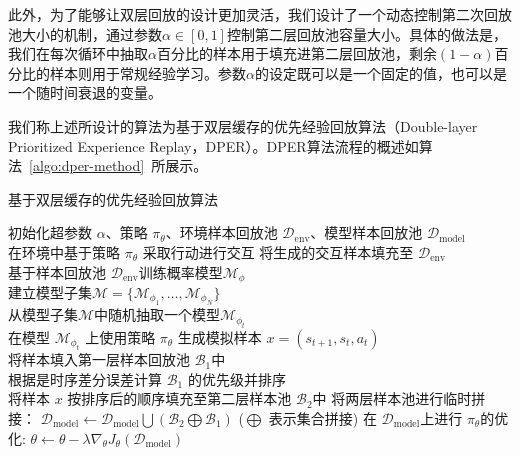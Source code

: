 此外，为了能够让双层回放的设计更加灵活，我们设计了一个动态控制第二次回放池大小的机制，通过参数$\alpha\in[0,1]$控制第二层回放池容量大小。具体的做法是，我们在每次循环中抽取$\alpha$百分比的样本用于填充进第二层回放池，剩余$(1-\alpha)$百分比的样本则用于常规经验学习。参数$\alpha$的设定既可以是一个固定的值，也可以是一个随时间衰退的变量。

我们称上述所设计的算法为基于双层缓存的优先经验回放算法（Double-layer Prioritized Experience Replay，DPER）。DPER算法流程的概述如算法~\ref{algo:dper-method}~所展示。

\begin{algorithm}[t]
\caption{基于双层缓存的优先经验回放算法}
\label{algo:dper-method}
\begin{algorithmic}
\STATE 初始化超参数 $\alpha$、策略 $\pi_\theta$、环境样本回放池 $\mathcal{D}_{\mathrm{env}}$、模型样本回放池 $\mathcal{D}_{\mathrm{model}}$\\
    \STATE 在环境中基于策略 $\pi_\theta$ 采取行动进行交互
    \STATE 将生成的交互样本填充至 $\mathcal{D}_{\mathrm{env}}$\\
        \STATE 基于样本回放池 $\mathcal{D}_{\mathrm{env}}$训练概率模型$\mathcal{M}_\phi$\\
        \STATE 建立模型子集$\mathcal{M} = \{\mathcal{M}_{\phi_1},\ldots,\mathcal{M}_{\phi_{N}}\}$\\
            \STATE 从模型子集$\mathcal{M}$中随机抽取一个模型$\mathcal{M}_{\phi_t}$\\
            \STATE 在模型 $\mathcal{M}_{\phi_t}$ 上使用策略 $\pi_\theta$ 生成模拟样本 $x=\left(s_{t+1},s_t,a_t\right)$ \\
            \STATE 将样本填入第一层样本回放池 $\mathcal{B}_1$中\\
        \ENDFOR
        \STATE 根据是时序差分误差计算 $\mathcal{B}_1$ 的优先级并排序\\
                \STATE 将样本 $x$ 按排序后的顺序填充至第二层样本池 $\mathcal{B}_{2}$中
            \ENDIF
        \ENDFOR
        \STATE 将两层样本池进行临时拼接： $\mathcal{D}_{\mathrm{model}}\leftarrow\mathcal{D}_{\mathrm{model}}\bigcup(\mathcal{B}_2\bigoplus\mathcal{B}_1)$ ($\bigoplus$ 表示集合拼接)
    \ENDFOR
    \STATE 在 $\mathcal{D}_{\mathrm{model}}$上进行 $\pi_\theta$的优化: $\theta\leftarrow \theta - \lambda\nabla_\theta J_\theta(\mathcal{D}_{\mathrm{model}})$
\ENDFOR
\end{algorithmic}
\end{algorithm}

